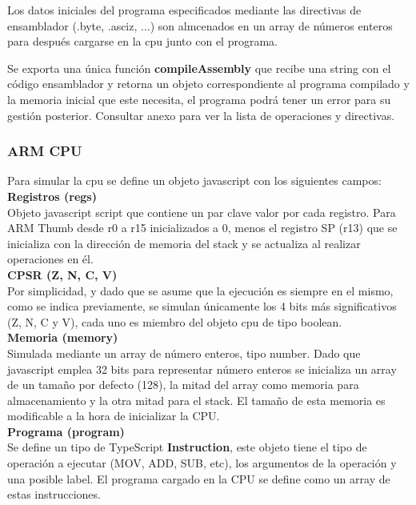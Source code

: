 {        Los datos iniciales del programa especificados mediante las directivas de ensamblador (.byte, .asciz, ...)
        son almcenados en un array de números enteros para después cargarse en la cpu junto con el programa.

        Se exporta una única función \textbf{compileAssembly} que recibe una string con el código ensamblador y retorna un objeto
        correspondiente al programa compilado y la memoria inicial que este necesita, el programa podrá tener un error
        para su gestión posterior. Consultar anexo para ver la lista de operaciones y directivas. 

        \subsubsection{ARM CPU}
        Para simular la cpu se define un objeto javascript con los siguientes campos: \\

        \textbf{Registros (regs)} \\
        Objeto javascript script que contiene un par clave valor por cada registro.
        Para ARM Thumb desde r0 a r15 inicializados a 0, menos el registro SP (r13)
        que se inicializa con la dirección de memoria del stack y se actualiza al realizar operaciones en él. \\

        \textbf{CPSR (Z, N, C, V)} \\
        Por simplicidad, y dado que se asume que la ejecución es siempre en el mismo, como se indica previamente,
        se simulan únicamente los 4 bits más significativos (Z, N, C y V), cada uno es miembro del objeto cpu
        de tipo boolean. \\

        \textbf{Memoria (memory)} \\
        Simulada mediante un array de número enteros, tipo number. Dado que javascript emplea 32 bits para representar número enteros
        se inicializa un array de un tamaño por defecto (128), la mitad del array como memoria para almacenamiento y la otra mitad para el stack.
        El tamaño de esta memoria es modificable a la hora de inicializar la CPU. \\
        
        \textbf{Programa (program)} \\
        Se define un tipo de TypeScript \textbf{Instruction}, este objeto tiene el tipo de operación a ejecutar
        (MOV, ADD, SUB, etc), los argumentos de la operación y una posible label. El programa cargado en la CPU se define como un array de estas instrucciones. \\

}
